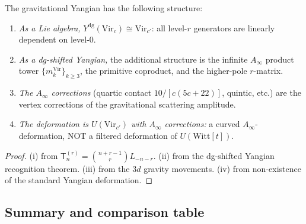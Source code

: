 \documentclass[11pt]{article}
\begin{document}
\begin{theorem}
\label{thm:gy-structure}
The gravitational Yangian has the following structure:
\begin{enumerate}[label=\textup{(\roman*)}]
\item \emph{As a Lie algebra,}
  $Y^{\mathrm{dg}}(\mathrm{Vir}_c) \cong \mathrm{Vir}_{c'}$:
  all level-$r$ generators are linearly dependent on level-$0$.

\item \emph{As a dg-shifted Yangian,}
  the additional structure is the infinite $A_\infty$ product tower
  $\{m_k^{\mathrm{Vir}}\}_{k \ge 3}$, the primitive coproduct,
  and the higher-pole $r$-matrix.

\item \emph{The $A_\infty$ corrections}
  (quartic contact $10/[c(5c+22)]$, quintic, etc.) are the vertex
  corrections of the gravitational scattering amplitude.

\item \emph{The deformation is $U(\mathrm{Vir}_{c'})$ with
  $A_\infty$ corrections:} a curved $A_\infty$-deformation,
  NOT a filtered deformation of $U(\mathrm{Witt}[t])$.
\end{enumerate}
\end{theorem}

\begin{proof}
(i) from $\mathsf{T}_n^{(r)} = \binom{n+r-1}{r}L_{-n-r}$.
(ii) from the dg-shifted Yangian recognition theorem.
(iii) from the $3d$ gravity movements.
(iv) from non-existence of the standard Yangian deformation.
\end{proof}


\subsection{Summary and comparison table}
\end{document}
